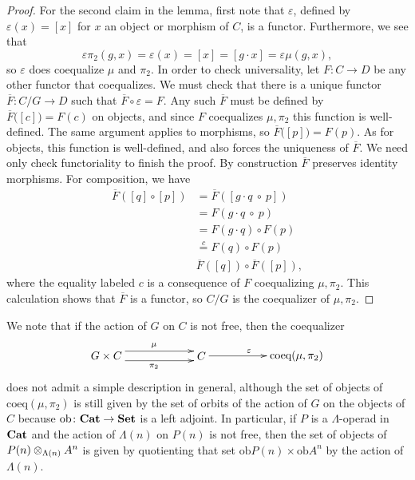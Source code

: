 \begin{proof}
For the second claim in the lemma, first note that $\varepsilon$, defined by $\varepsilon(x) = [x]$ for $x$ an object or morphism of $C$, is a functor. Furthermore, we see that 
\[
\varepsilon \pi_2(g, x) = \varepsilon(x) = [x] = [g \cdot x] = \varepsilon \mu(g,x),
\]
so $\varepsilon$ does coequalize $\mu$ and $\pi_2$. In order to check universality, let $F \colon C \to D$ be any other functor that coequalizes. We must check that there is a unique functor $\overline{F} \colon C/G \to D$ such that $\overline{F} \circ \varepsilon = F$. Any such $\overline{F}$ must be defined by $\overline{F}\big( [c] \big) = F(c)$ on objects, and since $F$ coequalizes $\mu, \pi_2$ this function is well-defined. The same argument applies to morphisms, so $\overline{F}\big( [p] \big) = F(p)$. As for objects, this function is well-defined, and also forces the uniqueness of $\overline{F}$. We need only check functoriality to finish the proof. By construction $\overline{F}$ preserves identity morphisms. For composition, we have
\begin{align*}
\overline{F} \left( [q] \circ [p] \right) & = \overline{F}\left( [g\cdot q \ \circ \ p] \right) \\
& = F(g\cdot q \ \circ \ p) \\
& = F(g \cdot q) \circ F(p) \\ 
& \stackrel{c}{=} F(q) \circ F(p) \\
& \overline{F}\left( [q] \right) \circ \overline{F}\left( [p] \right),
\end{align*}
where the equality labeled $c$ is a consequence of $F$ coequalizing $\mu, \pi_2$. This calculation shows that $\overline{F}$ is a functor, so $C/G$ is the coequalizer of $\mu, \pi_2$.
\end{proof}

\begin{rem}\label{rem:obj-coeq}
We note that if the action of $G$ on $C$ is not free, then the coequalizer
    \[
        \xy
            (0,0)*+{G \times C}="00";
            (30,0)*+{C}="10";
            (60,0)*+{\textrm{coeq}(\mu, \pi_2)}="20";
            {\ar@<1ex>^{\mu} "00" ; "10"};
            {\ar@<-1ex>_{\pi_2} "00" ; "10"};
            {\ar^{\varepsilon} "10" ; "20"};
        \endxy
    \]
does not admit a simple description in general, although the set of objects of $\textrm{coeq}(\mu, \pi_2)$ is still given by the set of orbits of the action of $G$ on the objects of $C$ because $\textrm{ob} \colon \mathbf{Cat} \to \mathbf{Set}$ is a left adjoint. In particular, if $P$ is a $\Lambda$-operad in $\mathbf{Cat}$ and the action of $\Lambda(n)$ on $P(n)$ is not free, then the set of  objects of $P(n) \otimes_{\Lambda(n)} A^{n}$ is given by quotienting that set $\textrm{ob}P(n) \times \textrm{ob}A^n$ by the action of $\Lambda(n)$.
\end{rem}


